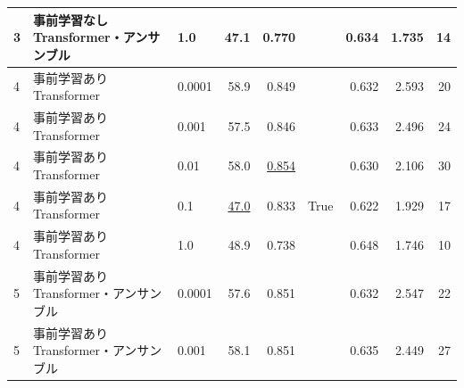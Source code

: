 \documentclass[12pt]{jarticle}
\numberwithin{equation}{section}    %
\numberwithin{figure}{section}      %
\numberwithin{table}{section}      %
\begin{document}
\begin{table}[bt]
\begin{center}
{\begin{tabular}{|l|l|l|rrc|rrr|}
                3                        & 事前学習なしTransformer・アンサンブル & 1.0                                      & 47.1                         & 0.770                     &                            & 0.634                         & 1.735                             & 14                         \\
                \hline
                4                        & 事前学習ありTransformer        & 0.0001                                   & 58.9                         & 0.849                     &                            & 0.632                         & 2.593                             & 20                         \\
                4                        & 事前学習ありTransformer        & 0.001                                    & 57.5                         & 0.846                     &                            & 0.633                         & 2.496                             & 24                         \\
                4                        & 事前学習ありTransformer        & 0.01                                     & 58.0                         & \underline{0.854}         &                            & 0.630                         & 2.106                             & 30                         \\
                4                        & 事前学習ありTransformer        & 0.1                                      & \underline{47.0}             & 0.833                     & True                       & 0.622                         & 1.929                             & 17                         \\
                4                        & 事前学習ありTransformer        & 1.0                                      & 48.9                         & 0.738                     &                            & 0.648                         & 1.746                             & 10                         \\
                \hline
                5                        & 事前学習ありTransformer・アンサンブル & 0.0001                                   & 57.6                         & 0.851                     &                            & 0.632                         & 2.547                             & 22                         \\
                5                        & 事前学習ありTransformer・アンサンブル & 0.001                                    & 58.1                         & 0.851                     &                            & 0.635                         & 2.449                             & 27                         \\

\end{tabular}}
\end{center}
\end{table}
\end{document}
